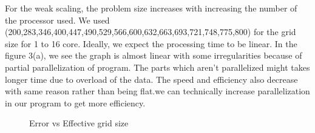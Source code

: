 \documentclass{article}
\begin{document}
For the weak scaling, the problem size increases with increasing the number of the processor used. We used (200,283,346,400,447,490,529,566,600,632,663,693,721,748,775,800) for the grid size for 1 to 16 core. Ideally, we expect the processing time to be linear. In the figure 3(a), we see the graph is almost linear with some irregularities because of partial parallelization of program. The parts which aren't parallelized might takes longer time due to overload of the data. The speed and efficiency also decrease with same reason rather than being flat.we can technically increase parallelization in our program to get more efficiency.

 \begin{figure}[!htb]
        \caption{\label{fig:my-label} Error vs Effective grid size}
      \end{figure}

\newpage
\end{document}
